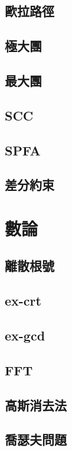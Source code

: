 \documentclass[a4paper,10pt,twocolumn,oneside]{article}
\begin{document}
\subsection{歐拉路徑}

\subsection{極大團}

\subsection{最大團}

\subsection{SCC}

\subsection{SPFA}

\subsection{差分約束}

\section{數論}
\subsection{離散根號}

\subsection{ex-crt}

\subsection{ex-gcd}

\subsection{FFT}

\subsection{高斯消去法}

\subsection{喬瑟夫問題}

\end{document}
